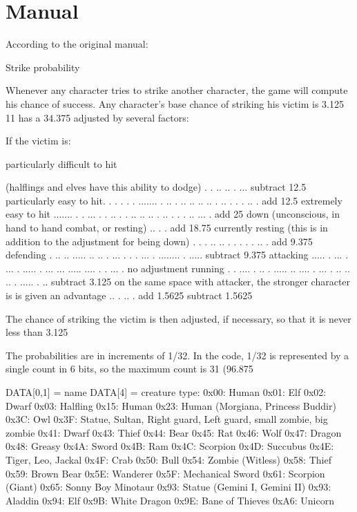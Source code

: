 \documentclass[10pt]{report}
\begin{document}
\section{Manual}

According to the original manual:

Strike probability

Whenever any character tries to strike another character, the game will
compute his chance of success. Any character's base chance of striking
his victim is 3.125%
11 has a 34.375%
adjusted by several factors:

If the victim is:

particularly difficult to hit

(halflings and elves have this ability to dodge) . . .. .. . ... subtract 12.5%
particularly easy to hit. . . . . . ....... . .. . .. .. .. .. . .. . . . .. . add 12.5%
extremely easy to hit ....... . . ... . . .. . . .. .. .. . .. . . . .. ... . add 25%
down (unconscious, in hand to hand combat, or resting) .. . . add 18.75%
currently resting (this is in
addition to the adjustment for being down) . . . .. .. . . . . . .. . add 9.375 %
defending . .. .. ..... .. .. . ... . . . ... . ........ . ..... subtract 9.375%
attacking ..... . ... . ... . ..... . ... ... ..... .... . . ... . no adjustment
running . . .... . .. . ..... .. .... . ... . .. .. .. . ..... . .. subtract 3.125 %
on the same space with attacker, the stronger character is
is given an advantage .. . .. . add 1.5625%
subtract 1.5625%

The chance of striking the victim is then adjusted, if necessary, so that it
is never less than 3.125%

The probabilities are in increments of 1/32. In the code, 1/32 is represented by
a single count in 6 bits, so the maximum count is 31 (96.875%

DATA[0,1] = name
DATA[4] = creature type:
  0x00: Human
  0x01: Elf
  0x02: Dwarf
  0x03: Halfling
  0x15: Human
  0x23: Human (Morgiana, Princess Buddir)
  0x3C: Owl
  0x3F: Statue, Sultan, Right guard, Left guard, small zombie, big zombie
  0x41: Dwarf
  0x43: Thief
  0x44: Bear
  0x45: Rat
  0x46: Wolf
  0x47: Dragon
  0x48: Greasy
  0x4A: Sword
  0x4B: Ram
  0x4C: Scorpion
  0x4D: Succubus
  0x4E: Tiger, Leo, Jackal
  0x4F: Crab
  0x50: Bull
  0x54: Zombie (Witless)
  0x58: Thief
  0x59: Brown Bear
  0x5E: Wanderer
  0x5F: Mechanical Sword
  0x61: Scorpion (Giant)
  0x65: Sonny Boy Minotaur
  0x93: Statue (Gemini I, Gemini II)
  0x93: Aladdin
  0x94: Elf
  0x9B: White Dragon
  0x9E: Bane of Thieves
  0xA6: Unicorn
\end{document}
